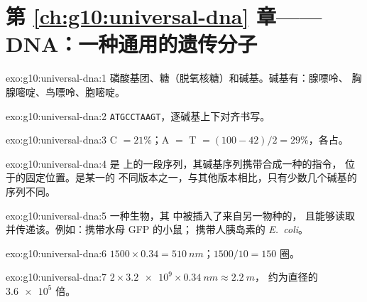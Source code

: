 \section*{第 \ref{ch:g10:universal-dna} 章——DNA：一种通用的遗传分子}

\begin{solution}{exo:g10:universal-dna:1}
磷酸基团、糖（脱氧核糖）和碱基。碱基有：腺嘌呤、
胸腺嘧啶、鸟嘌呤、胞嘧啶。
\end{solution}

\begin{solution}{exo:g10:universal-dna:2}
\texttt{ATGCCTAAGT}，逐碱基上下对齐书写。
\end{solution}

\begin{solution}{exo:g10:universal-dna:3}
C $= 21\%$；A $=$ T $= (100 - 42)/2 = 29\%$，各占。
\end{solution}

\begin{solution}{exo:g10:universal-dna:4}
是  上的一段序列，其碱基序列携带合成一种的指令，
位于的固定位置。是某一的
不同版本之一，与其他版本相比，只有少数几个碱基的
序列不同。
\end{solution}

\begin{solution}{exo:g10:universal-dna:5}
一种生物，其  中被插入了来自另一物种的，
且能够读取并传递该。例如：携带水母 GFP 的小鼠；
携带人胰岛素的 \emph{E.~coli}。
\end{solution}

\begin{solution}{exo:g10:universal-dna:6}
$1500 \times 0.34 = \qty{510}{nm}$；$1500/10 = 150$ 圈。
\end{solution}

\begin{solution}{exo:g10:universal-dna:7}
$2 \times \num{3.2e9} \times \qty{0.34}{nm} \approx \qty{2.2}{m}$，
约为直径的 $\num{3.6e5}$ 倍。
\end{solution}

